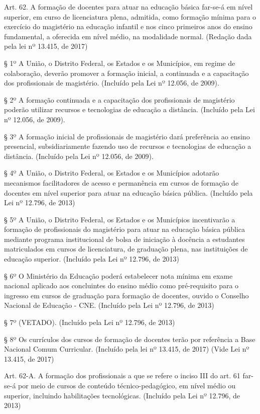 \documentclass[
]{book}
\begin{document}
Art. 62. A formação de docentes para atuar na educação básica far-se-á em nível superior, em curso de licenciatura plena, admitida, como formação mínima para o exercício do magistério na educação infantil e nos cinco primeiros anos do ensino fundamental, a oferecida em nível médio, na modalidade normal. (Redação dada pela lei nº 13.415, de 2017)

§ 1º A União, o Distrito Federal, os Estados e os Municípios, em regime de colaboração, deverão promover a formação inicial, a continuada e a capacitação dos profissionais de magistério. (Incluído pela Lei nº 12.056, de 2009).

§ 2º A formação continuada e a capacitação dos profissionais de magistério poderão utilizar recursos e tecnologias de educação a distância. (Incluído pela Lei nº 12.056, de 2009).

§ 3º A formação inicial de profissionais de magistério dará preferência ao ensino presencial, subsidiariamente fazendo uso de recursos e tecnologias de educação a distância. (Incluído pela Lei nº 12.056, de 2009).

§ 4º A União, o Distrito Federal, os Estados e os Municípios adotarão mecanismos facilitadores de acesso e permanência em cursos de formação de docentes em nível superior para atuar na educação básica pública. (Incluído pela Lei nº 12.796, de 2013)

§ 5º A União, o Distrito Federal, os Estados e os Municípios incentivarão a formação de profissionais do magistério para atuar na educação básica pública mediante programa institucional de bolsa de iniciação à docência a estudantes matriculados em cursos de licenciatura, de graduação plena, nas instituições de educação superior. (Incluído pela Lei nº 12.796, de 2013)

§ 6º O Ministério da Educação poderá estabelecer nota mínima em exame nacional aplicado aos concluintes do ensino médio como pré-requisito para o ingresso em cursos de graduação para formação de docentes, ouvido o Conselho Nacional de Educação - CNE. (Incluído pela Lei nº 12.796, de 2013)

§ 7º (VETADO). (Incluído pela Lei nº 12.796, de 2013)

§ 8º Os currículos dos cursos de formação de docentes terão por referência a Base Nacional Comum Curricular. (Incluído pela lei nº 13.415, de 2017) (Vide Lei nº 13.415, de 2017)

Art. 62-A. A formação dos profissionais a que se refere o inciso III do art. 61 far-se-á por meio de cursos de conteúdo técnico-pedagógico, em nível médio ou superior, incluindo habilitações tecnológicas. (Incluído pela Lei nº 12.796, de 2013)
\end{document}
